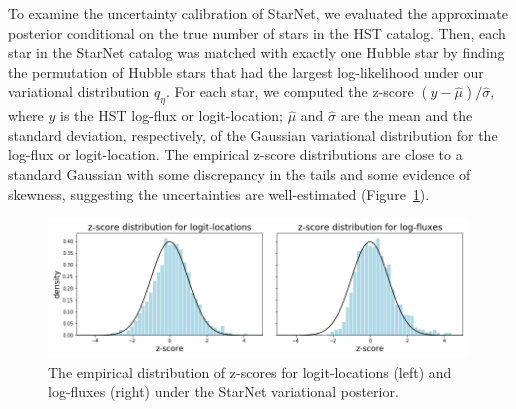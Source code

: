 
To examine the uncertainty calibration of StarNet, we evaluated the approximate posterior
conditional on the true number of stars in the HST catalog.
Then, each star in the StarNet catalog was matched with exactly one Hubble star by finding the permutation of Hubble stars that had the largest log-likelihood under our variational distribution $q_\eta$.
For each star, we computed the z-score $(y - \hat \mu) / \hat \sigma$, where $y$ is the HST log-flux or
logit-location; $\hat \mu$ and $\hat\sigma$ are the mean and the standard deviation, respectively, of the Gaussian variational distribution for the log-flux or logit-location.
The empirical z-score distributions are close to a standard Gaussian with some discrepancy in the tails and some evidence of skewness, suggesting the uncertainties are well-estimated (Figure~\ref{fig:z-score_calibration}).

\begin{figure}[tb]
    \centering
    \includegraphics[width=0.99\textwidth]{figures/m2_results/zscore_calibration.png}
    \vspace{-0.5cm}
    \caption{The empirical distribution of z-scores for logit-locations (left) and log-fluxes (right) under the StarNet variational posterior.
}
    \label{fig:z-score_calibration}
\end{figure}

